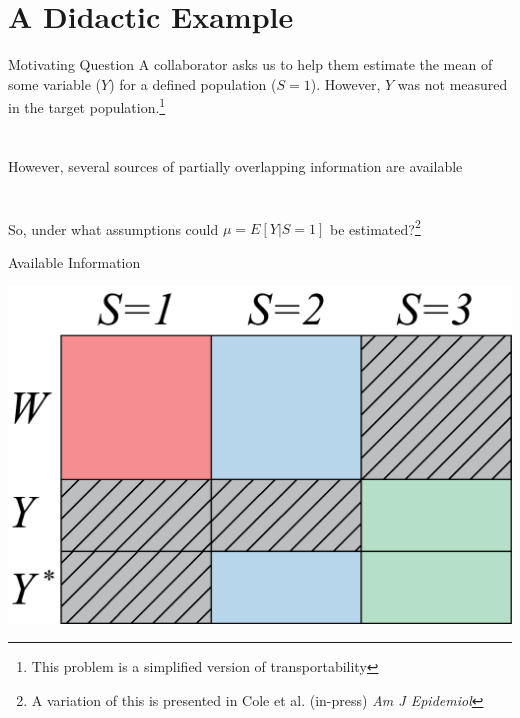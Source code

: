 \documentclass{beamer}
\begin{document}
\section{A Didactic Example}

\begin{frame}{Motivating Question}
	A collaborator asks us to help them estimate the mean of some variable ($Y$) for a defined population ($S=1$). However, $Y$ was not measured in the target population.\footnote[frame]{This problem is a simplified version of transportability}\\~\\~\\
	However, several sources of partially overlapping information are available\\~\\~\\
	So, under what assumptions could $\mu = E[Y|S=1]$ be estimated?\footnote[frame]{A variation of this is presented in Cole et al. (in-press) \textit{Am J Epidemiol}}
\end{frame}

\begin{frame}{Available Information}
	\begin{center}
		\includegraphics[scale=0.6]{code/data_sources.png}
	\end{center}
\end{frame}
\end{document}
